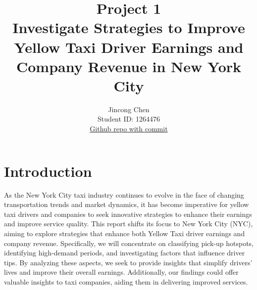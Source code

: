 \documentclass[11pt]{article}
\title{\textbf{Project 1} \\ Investigate Strategies to Improve  Yellow Taxi Driver Earnings and Company Revenue in New York City}
\author{
Jincong Chen \\
Student ID: 1264476 \\
\href{https://github.com/MAST30034-Applied-Data-Science/mast30034-project-1-jcc0026.git}{Github repo with commit}
}
\begin{document}
\maketitle

\section{Introduction}

As the New York City taxi industry continues to evolve in the face of changing transportation trends and market dynamics, it has become imperative for yellow taxi drivers and companies to seek innovative strategies to enhance their earnings and improve service quality. 
This report shifts its focus to New York City (NYC), aiming to explore strategies that enhance both Yellow Taxi driver earnings and company revenue. Specifically, we will concentrate on classifying pick-up hotspots, identifying high-demand periods, and investigating factors that influence driver tips. By analyzing these aspects, we seek to provide insights that simplify drivers' lives and improve their overall earnings. Additionally, our findings could offer valuable insights to taxi companies, aiding them in delivering improved services.
\end{document}
